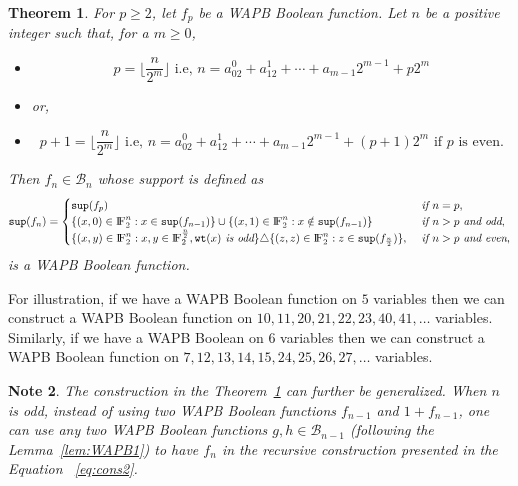 \documentclass{article}[12pt]
\newtheorem{theorem}{Theorem}[section]
\newtheorem{note}[theorem]{Note}
\newcommand{\FF}{{\rm I\!F}}
\newcommand{\CB}{\mathcal{B}}
\newcommand{\wt}{\mathtt{wt}}
\newcommand{\spt}{\mathtt{sup}}
\begin{document}
\begin{theorem}\label{thm:WAPB2}
    For $p \geq 2$, let $f_p$ be a WAPB Boolean function.
    Let $n$ be a positive integer such that, for a $m \geq 0$,
    \begin{itemize}
     \item \begin{equation}\label{eqn:T1}
            p  = \lfloor\frac{n}{2^m}\rfloor \text{ i.e, } n = a_02^0 + a_12^1 + \cdots + a_{m-1}2^{m-1} + p2^m
           \end{equation}
     \item [] or,
     \item \begin{equation} \label{eqn:T2}
     p + 1 = \lfloor\frac{n}{2^m}\rfloor \text{ i.e, } n = a_02^0 + a_12^1 + \cdots + a_{m-1}2^{m-1} + (p+1)2^m \text{ if $p$ is even}.
           \end{equation}

    \end{itemize}
 Then $f_n \in \CB_n$ whose support is defined as 
	\begin{equation}\label{eq:cons2}
	\spt(f_n)=
	\begin{cases} 
	\spt(f_p) & \textit{ if } n = p, \\
	\{(x,0) \in \FF_2^n : x \in \spt(f_{n-1})\} \cup
	\{(x,1) \in \FF_2^n : x \notin \spt(f_{n-1})\} & \textit{ if } n > p \textit{ and odd},\\ 
	\{(x,y) \in \FF_2^n : x,y \in \FF_2^{\frac{n}{2}}, \wt(x) \textit{ is odd}\} \triangle \{(z,z) \in \FF_2^n : z \in \spt(f_{\frac{n}{2}})\}, & \textit{ if } n > p \textit{ and even},
	\end{cases}
	\end{equation}	
 is a WAPB Boolean function.
 \end{theorem}
 For illustration, if we have a WAPB Boolean function on $5$ variables then we can construct a WAPB Boolean function on $10,11,20,21,22,23,40,41, \ldots$ variables. Similarly, if we have a WAPB Boolean on $6$ variables then we can construct a WAPB Boolean function on $7, 12,13,14,15,24,25,26,27, \ldots$ variables.
 
\begin{note}\label{nt:WAPB}
The construction in the Theorem~\ref{thm:WAPB2} can further be generalized. When $n$ is odd, instead of using two WAPB Boolean functions $f_{n-1}$ and $1+f_{n-1}$, one can use any two WAPB Boolean functions $g, h \in \CB_{n-1}$ (following the Lemma~\ref{lem:WAPB1}) to have $f_n$ in the recursive construction presented in the Equation ~\ref{eq:cons2}.
\end{note}
\end{document}
